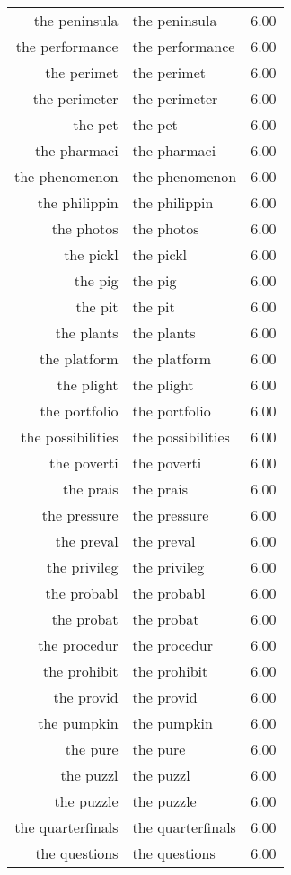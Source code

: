 \begin{table}[ht]
\begin{tabular}{rlr}
  the peninsula & the peninsula & 6.00 \\ 
  the performance & the performance & 6.00 \\ 
  the perimet & the perimet & 6.00 \\ 
  the perimeter & the perimeter & 6.00 \\ 
  the pet & the pet & 6.00 \\ 
  the pharmaci & the pharmaci & 6.00 \\ 
  the phenomenon & the phenomenon & 6.00 \\ 
  the philippin & the philippin & 6.00 \\ 
  the photos & the photos & 6.00 \\ 
  the pickl & the pickl & 6.00 \\ 
  the pig & the pig & 6.00 \\ 
  the pit & the pit & 6.00 \\ 
  the plants & the plants & 6.00 \\ 
  the platform & the platform & 6.00 \\ 
  the plight & the plight & 6.00 \\ 
  the portfolio & the portfolio & 6.00 \\ 
  the possibilities & the possibilities & 6.00 \\ 
  the poverti & the poverti & 6.00 \\ 
  the prais & the prais & 6.00 \\ 
  the pressure & the pressure & 6.00 \\ 
  the preval & the preval & 6.00 \\ 
  the privileg & the privileg & 6.00 \\ 
  the probabl & the probabl & 6.00 \\ 
  the probat & the probat & 6.00 \\ 
  the procedur & the procedur & 6.00 \\ 
  the prohibit & the prohibit & 6.00 \\ 
  the provid & the provid & 6.00 \\ 
  the pumpkin & the pumpkin & 6.00 \\ 
  the pure & the pure & 6.00 \\ 
  the puzzl & the puzzl & 6.00 \\ 
  the puzzle & the puzzle & 6.00 \\ 
  the quarterfinals & the quarterfinals & 6.00 \\ 
  the questions & the questions & 6.00 \\ 

\end{tabular}
\end{table}
